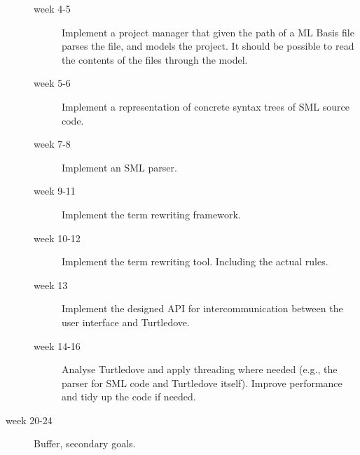 \documentclass[a4paper,oneside,final]{article}
\begin{document}
\begin{description}
\begin{description}
  \item[week 4-5] Implement a project manager that given the path of a ML Basis
    file parses the file, and models the project. It should be possible to read
    the contents of the files through the model.
    
  \item[week 5-6] Implement a representation of concrete syntax trees of SML
    source code.
    
  \item[week 7-8] Implement an SML parser.

  \item[week 9-11] Implement the term rewriting framework.
    
  \item[week 10-12] Implement the term rewriting tool. Including the actual
    rules.
    
  \item[week 13] Implement the designed API for intercommunication between the
    user interface and Turtledove.
    
  \item[week 14-16] Analyse Turtledove and apply threading where needed (e.g.,
    the parser for SML code and Turtledove itself). Improve performance and tidy
    up the code if needed.

  \end{description}

\item[week 20-24] Buffer, secondary goals.

\end{description}
\end{document}
